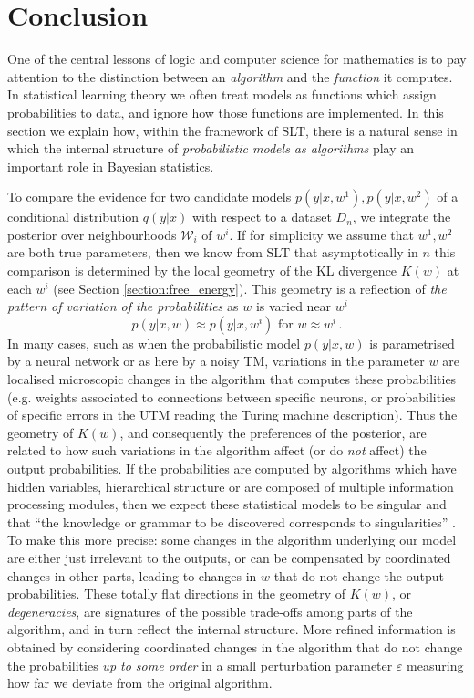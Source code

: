 \documentclass[english,letter paper,12pt,reqno]{article}
\theoremstyle{definition}
\def\be{\begin{equation}}
\def\ee{\end{equation}}
\begin{document}
\section{Conclusion}\label{section:conclusion}

One of the central lessons of logic and computer science for mathematics is to pay attention to the distinction between an \emph{algorithm} and the \emph{function} it computes. In statistical learning theory we often treat models as functions which assign probabilities to data, and ignore how those functions are implemented. In this section we explain how, within the framework of SLT, there is a natural sense in which the internal structure of \emph{probabilistic models as algorithms} play an important role in Bayesian statistics.

To compare the evidence for two candidate models $p(y|x,w^1), p(y|x,w^2)$ of a conditional distribution $q(y|x)$ with respect to a dataset $D_n$, we integrate the posterior over neighbourhoods $\mathcal{W}_i$ of $w^i$. If for simplicity we assume that $w^1, w^2$ are both true parameters, then we know from SLT that asymptotically in $n$ this comparison is determined by the local geometry of the KL divergence $K(w)$ at each $w^i$ (see Section \ref{section:free_energy}). This geometry is a reflection of \emph{the pattern of variation of the probabilities} as $w$ is varied near $w^i$
\be\label{eq:local_variation_p}
p(y|x,w) \approx p(y|x,w^i) \text{ for } w \approx w^i\,.
\ee
In many cases, such as when the probabilistic model $p(y|x,w)$ is parametrised by a neural network or as here by a noisy TM, variations in the parameter $w$ are localised microscopic changes in the algorithm that computes these probabilities (e.g. weights associated to connections between specific neurons, or probabilities of specific errors in the UTM reading the Turing machine description). Thus the geometry of $K(w)$, and consequently the preferences of the posterior, are related to how such variations in the algorithm affect (or do \emph{not} affect) the output probabilities. If the probabilities are computed by algorithms which have hidden variables, hierarchical structure or are composed of multiple information processing modules, then we expect these statistical models to be singular and that ``the knowledge or grammar to be discovered corresponds to singularities'' \cite[\S 1.2]{watanabeAlgebraicGeometryStatistical2009}.
\\

To make this more precise: some changes in the algorithm underlying our model are either just irrelevant to the outputs, or can be compensated by coordinated changes in other parts, leading to changes in $w$ that do not change the output probabilities. These totally flat directions in the geometry of $K(w)$, or \emph{degeneracies}, are signatures of the possible trade-offs among parts of the algorithm, and in turn reflect the internal structure. More refined information is obtained by considering coordinated changes in the algorithm that do not change the probabilities \emph{up to some order} in a small perturbation parameter $\varepsilon$ measuring how far we deviate from the original algorithm.
\end{document}
